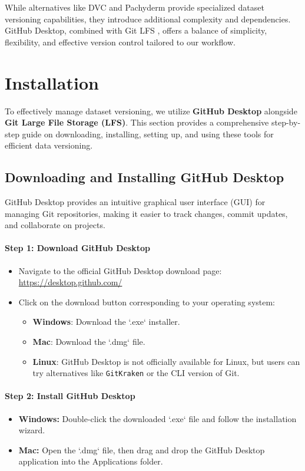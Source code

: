 While alternatives like  DVC  and  Pachyderm  provide specialized dataset versioning capabilities, they introduce additional complexity and dependencies. GitHub Desktop, combined with  Git LFS , offers a balance of simplicity, flexibility, and effective version control tailored to our workflow.

\section{Installation}
To effectively manage dataset versioning, we utilize \textbf{GitHub Desktop} alongside \textbf{Git Large File Storage (LFS)}. This section provides a comprehensive step-by-step guide on downloading, installing, setting up, and using these tools for efficient data versioning\cite{GitHubDesktop}.

\subsection{Downloading and Installing GitHub Desktop}
GitHub Desktop provides an intuitive graphical user interface (GUI) for managing Git repositories, making it easier to track changes, commit updates, and collaborate on projects\cite{GitHubDesktop}.

\paragraph{Step 1: Download GitHub Desktop}
\begin{itemize}
    \item Navigate to the official GitHub Desktop download page: \url{https://desktop.github.com/}
    \item Click on the download button corresponding to your operating system:
    \begin{itemize}
        \item \textbf{Windows}: Download the `.exe` installer.
        \item \textbf{Mac}: Download the `.dmg` file.
        \item \textbf{Linux}: GitHub Desktop is not officially available for Linux, but users can try alternatives like \texttt{GitKraken} or the CLI version of Git.
    \end{itemize}
\end{itemize}

\paragraph{Step 2: Install GitHub Desktop}
\begin{itemize}
    \item \textbf{Windows:} Double-click the downloaded `.exe` file and follow the installation wizard.
    \item \textbf{Mac:} Open the `.dmg` file, then drag and drop the GitHub Desktop application into the Applications folder.
\end{itemize}

